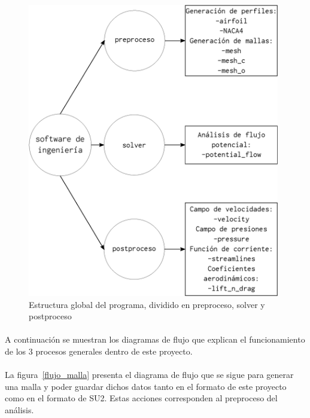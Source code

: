 \documentclass[letterpaper, openright, 12pt]{book}
\begin{document}
    \begin{figure}[htbp!]
        \centering
        \includegraphics[keepaspectratio, width=110mm]{./Imagenes/estructura_global}
        \caption[Estructura global del programa]{Estructura global del programa,
        dividido en preproceso, solver y postproceso}
        \label{estructura_global}
    \end{figure}

    \paragraph*{}
        A continuación se muestran los diagramas de flujo que explican el
        funcionamiento de los 3 procesos generales dentro de este proyecto.

    \paragraph*{}
        La figura~\ref{flujo_malla} presenta el diagrama de flujo que se sigue
        para generar una malla y poder guardar dichos datos tanto en el formato
        de este proyecto como en el formato de SU2. Estas acciones corresponden
        al preproceso del análisis.
\end{document}
